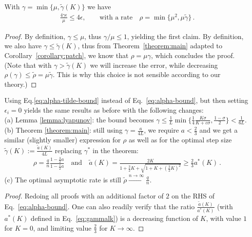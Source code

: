 \begin{corollary}
With $\gamma = \min\{\mu , \tilde{\gamma}(K)\}$ we have 
\begin{align*}
\frac {4 \gamma \epsilon }{\mu}  \le 4 \epsilon, \qquad 
\text{with a rate} \quad \rho = \min\{\mu^2, \mu \tilde{\gamma}\} \, .
\end{align*}
\begin{proof}
By definition, $\gamma \leq \mu$, thus $\gamma/ \mu \leq1$, yielding the first claim. By definition, we also have $\gamma \leq \tilde{\gamma}(K)$, thus from Theorem~\ref{theorem:main} adapted to Corollary~\ref{corollary:patch}, we know that $\rho = \mu \gamma$, which concludes the proof. (Note that  with $\gamma> \tilde{\gamma}(K)$ we will increase the error, while decreasing $\rho(\gamma) \le \tilde{\rho} = \mu \tilde{\gamma}$. This is why this choice is not sensible according to our theory.)
\end{proof} 
\end{corollary} 

\begin{corollary}
\label{corollary:patch}
Using Eq.\eqref{eq:alpha-tilde-bound} instead of Eq.~\eqref{eq:alpha-bound}, but then setting $\epsilon_i = 0$ yields the same results as before with the following changes: \\[3mm]
(a) Lemma \ref{lemma:lyapunov}: the bound becomes $\gamma \le \frac 1L \min \{ \frac 14 \frac{K \sigma}{K + c\sigma}, \frac {1-\sigma}{2} \} <  \frac{1}{6L}$. \\
(b) Theorem  \ref{theorem:main}: still using $\gamma = \frac{a}{4L}$, we require $a < \frac{2}{3}$ and we get a similar (slightly smaller) expression for $\rho$ as well as for the optimal step size $\tilde{\gamma}(K) := \frac{\tilde{a}(K)}{4L}$ replacing $\gamma^*$ in the theorem:
\begin{align} \label{eq:atilde}
\rho = \frac qn \frac{1-\frac 32 a}{1-\frac 12 a} \quad \text{and} \quad \tilde{a}(K) = \frac{2K}{1 + \frac3 2 K + \sqrt{1 + K + \left(\frac{3}{2}K \right)^2}} \geq \frac{2}{3} a^*(K) \, .
\end{align}
(c) The optimal asymptotic rate is  still $\tilde{\rho} \stackrel {n \to \infty} \longrightarrow  \frac qn$.
\begin{proof}
Redoing all proofs with an additional factor of $2$ on the RHS of  Eq.~\eqref{eq:alpha-bound}. One can also readily verify that the ratio $\frac{\tilde{a}(K)}{a^*(K)}$ (with $a^*(K)$ defined in Eq.~\eqref{eq:gammalk}) is a decreasing function of $K$, with value $1$ for $K=0$, and limiting value $\frac{2}{3}$ for $K \to \infty$.
\end{proof}
\end{corollary} 


